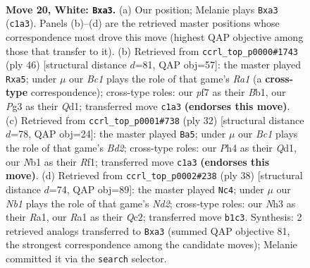 \documentclass[11pt]{article}
\begin{document}
\clearpage

\begin{figure}[p]\centering
\begin{subfigure}{0.46\textwidth}\centering
\resizebox{\linewidth}{!}{%
\newchessgame
\chessboard[
  setfen={1n1q1rk1/4bp2/5np1/2p4p/r2p3P/p2P2PN/4PPK1/RNB1QR2 w - - 0 20},
  showmover=false,
  pgfstyle=straightmove, color=movearrow, markmove={c1-a3}
]}
\caption{}
\end{subfigure}\hfill
\begin{subfigure}{0.46\textwidth}\centering
\resizebox{\linewidth}{!}{%
\newchessgame
\chessboard[
  setfen={r2q1rk1/p2n1pp1/4b2p/pp1pP3/3P4/1N4P1/6PP/RB1Q1R1K w - - 2 24},
  showmover=false,
  pgfstyle=straightmove, color=movearrow, markmove={a1-a5}
]}
\caption{}
\end{subfigure}
\\[4pt]
\begin{subfigure}{0.46\textwidth}\centering
\resizebox{\linewidth}{!}{%
\newchessgame
\chessboard[
  setfen={r1bq1rk1/p3bpp1/3p3p/2p4n/2P1P3/1P1P1N2/3BN1PP/R2Q1R1K w - - 1 17},
  showmover=false,
  pgfstyle=straightmove, color=movearrow, markmove={d2-a5}
]}
\caption{}
\end{subfigure}\hfill
\begin{subfigure}{0.46\textwidth}\centering
\resizebox{\linewidth}{!}{%
\newchessgame
\chessboard[
  setfen={r2qr1k1/1b3pp1/1pp2n1p/p7/P2Pp3/1PN1P2P/2QN1PP1/R1R3K1 w - - 1 20},
  showmover=false,
  pgfstyle=straightmove, color=movearrow, markmove={d2-c4}
]}
\caption{}
\end{subfigure}
\caption{\textbf{Move 20, White: \texttt{Bxa3}.} (a) Our position; Melanie plays \texttt{Bxa3} (\texttt{c1a3}). Panels (b)--(d) are the retrieved master positions whose correspondence most drove this move (highest QAP objective among those that transfer to it). (b) Retrieved from \texttt{ccrl\_top\_p0000\#1743} (ply 46) [structural distance $d$=81, QAP obj=57]: the master played \texttt{Rxa5}; under $\mu$ our \emph{Bc1} plays the role of that game's \emph{Ra1} (a \textbf{cross-type} correspondence); cross-type roles: our \emph{p}f7 as their \emph{B}b1, our \emph{P}g3 as their \emph{Q}d1; transferred move \texttt{c1a3} \textbf{(endorses this move)}. (c) Retrieved from \texttt{ccrl\_top\_p0001\#738} (ply 32) [structural distance $d$=78, QAP obj=24]: the master played \texttt{Ba5}; under $\mu$ our \emph{Bc1} plays the role of that game's \emph{Bd2}; cross-type roles: our \emph{P}h4 as their \emph{Q}d1, our \emph{N}b1 as their \emph{R}f1; transferred move \texttt{c1a3} \textbf{(endorses this move)}. (d) Retrieved from \texttt{ccrl\_top\_p0002\#238} (ply 38) [structural distance $d$=74, QAP obj=89]: the master played \texttt{Nc4}; under $\mu$ our \emph{Nb1} plays the role of that game's \emph{Nd2}; cross-type roles: our \emph{N}h3 as their \emph{R}a1, our \emph{R}a1 as their \emph{Q}c2; transferred move \texttt{b1c3}. Synthesis: 2 retrieved analogs transferred to \texttt{Bxa3} (summed QAP objective 81, the strongest correspondence among the candidate moves); Melanie committed it via the \texttt{search} selector.}
\label{fig:thought-m38}
\end{figure}
\end{document}
